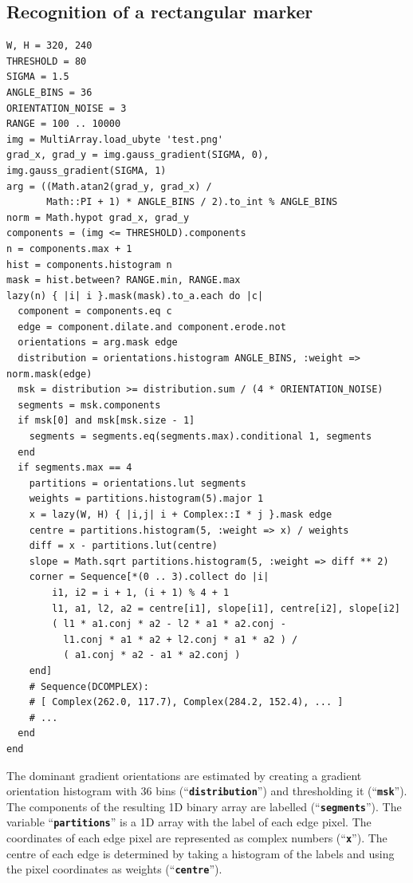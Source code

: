 \documentclass[12pt,a4paper,oneside,openright]{book}
\newcommand{\code}[1]{``\texttt{\textbf{\textcolor{codegray}{\small{#1}}}}''}
\begin{document}
\begin{CJK}{UTF8}{}
\subsection{Recognition of a rectangular marker}\label{cha:arlst}
\begin{lstlisting}
W, H = 320, 240
THRESHOLD = 80
SIGMA = 1.5
ANGLE_BINS = 36
ORIENTATION_NOISE = 3
RANGE = 100 .. 10000
img = MultiArray.load_ubyte 'test.png'
grad_x, grad_y = img.gauss_gradient(SIGMA, 0), img.gauss_gradient(SIGMA, 1)
arg = ((Math.atan2(grad_y, grad_x) /
       Math::PI + 1) * ANGLE_BINS / 2).to_int % ANGLE_BINS
norm = Math.hypot grad_x, grad_y
components = (img <= THRESHOLD).components
n = components.max + 1
hist = components.histogram n
mask = hist.between? RANGE.min, RANGE.max
lazy(n) { |i| i }.mask(mask).to_a.each do |c|
  component = components.eq c
  edge = component.dilate.and component.erode.not
  orientations = arg.mask edge
  distribution = orientations.histogram ANGLE_BINS, :weight => norm.mask(edge)
  msk = distribution >= distribution.sum / (4 * ORIENTATION_NOISE)
  segments = msk.components
  if msk[0] and msk[msk.size - 1]
    segments = segments.eq(segments.max).conditional 1, segments
  end
  if segments.max == 4
    partitions = orientations.lut segments
    weights = partitions.histogram(5).major 1
    x = lazy(W, H) { |i,j| i + Complex::I * j }.mask edge
    centre = partitions.histogram(5, :weight => x) / weights
    diff = x - partitions.lut(centre)
    slope = Math.sqrt partitions.histogram(5, :weight => diff ** 2)
    corner = Sequence[*(0 .. 3).collect do |i|
        i1, i2 = i + 1, (i + 1) % 4 + 1
        l1, a1, l2, a2 = centre[i1], slope[i1], centre[i2], slope[i2]
        ( l1 * a1.conj * a2 - l2 * a1 * a2.conj -
          l1.conj * a1 * a2 + l2.conj * a1 * a2 ) /
          ( a1.conj * a2 - a1 * a2.conj )
    end]
    # Sequence(DCOMPLEX):
    # [ Complex(262.0, 117.7), Complex(284.2, 152.4), ... ]
    # ...
  end
end
\end{lstlisting}
The dominant gradient orientations are estimated by creating a gradient orientation histogram with 36 bins (\code{distribution}) and thresholding it (\code{msk}). The components of the resulting \ac{1D} binary array are labelled (\code{segments}). The variable \code{partitions} is a \ac{1D} array with the label of each edge pixel. The coordinates of each edge pixel are represented as complex numbers (\code{x}). The centre of each edge is determined by taking a histogram of the labels and using the pixel coordinates as weights (\code{centre}).


\end{CJK}
\end{document}
